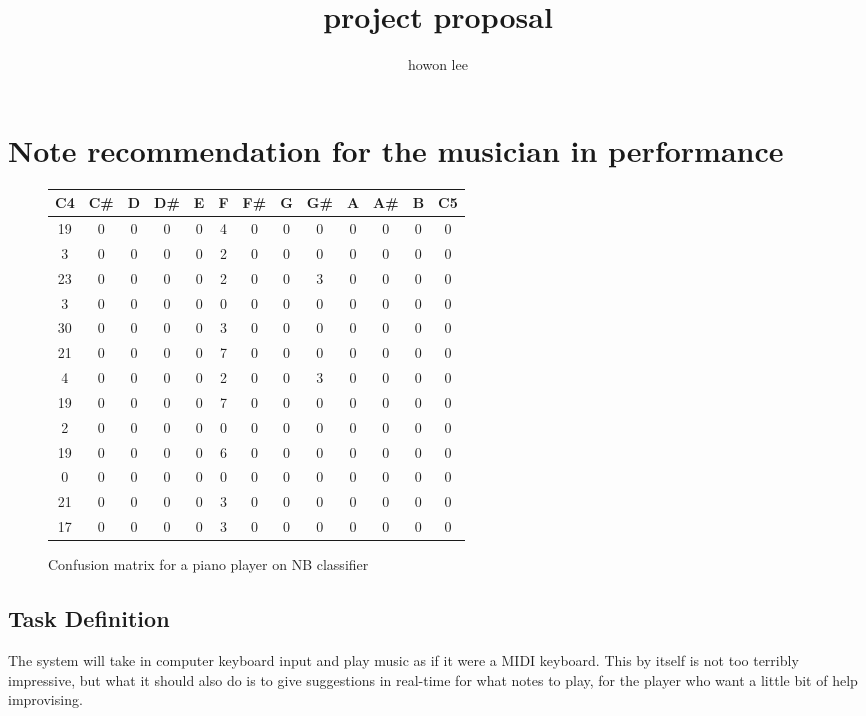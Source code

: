 \documentclass{article}
\begin{document}
\title{project proposal}
\author{howon lee}
\maketitle
\section*{Note recommendation for the musician in performance}

\begin{figure}
\begin{tabular}{c c c c c c c c c c c c c}
C4 & C\# & D & D\# & E & F & F\# & G & G\# & A & A\# & B & C5\\
\hline
19 & 0 & 0 & 0 & 0 & 4 & 0 & 0 & 0 & 0 & 0 & 0 & 0 \\
3  & 0 & 0 & 0 & 0 & 2 & 0 & 0 & 0 & 0 & 0 & 0 & 0\\
23 & 0 & 0 & 0 & 0 & 2 & 0 & 0 & 3 & 0 & 0 & 0 & 0\\
3  & 0 & 0 & 0 & 0 & 0 & 0 & 0 & 0 & 0 & 0 & 0 & 0\\
30 & 0 & 0 & 0 & 0 & 3 & 0 & 0 & 0 & 0 & 0 & 0 & 0\\
21 & 0 & 0 & 0 & 0 & 7 & 0 & 0 & 0 & 0 & 0 & 0 & 0\\
4  & 0 & 0 & 0 & 0 & 2 & 0 & 0 & 3 & 0 & 0 & 0 & 0\\
19 & 0 & 0 & 0 & 0 & 7 & 0 & 0 & 0 & 0 & 0 & 0 & 0\\
2  & 0 & 0 & 0 & 0 & 0 & 0 & 0 & 0 & 0 & 0 & 0 & 0\\
19 & 0 & 0 & 0 & 0 & 6 & 0 & 0 & 0 & 0 & 0 & 0 & 0\\
0  & 0 & 0 & 0 & 0 & 0 & 0 & 0 & 0 & 0 & 0 & 0 & 0\\
21 & 0 & 0 & 0 & 0 & 3 & 0 & 0 & 0 & 0 & 0 & 0 & 0\\
17 & 0 & 0 & 0 & 0 & 3 & 0 & 0 & 0 & 0 & 0 & 0 & 0\\
\end{tabular}
\caption{Confusion matrix for a piano player on NB classifier}
\end{figure}

\subsection*{Task Definition}
The system will take in computer keyboard input and play music as if it were a MIDI keyboard. This by itself is not too terribly impressive, but what it should also do is to give suggestions in real-time for what notes to play, for the player who want a little bit of help improvising.
\end{document}
